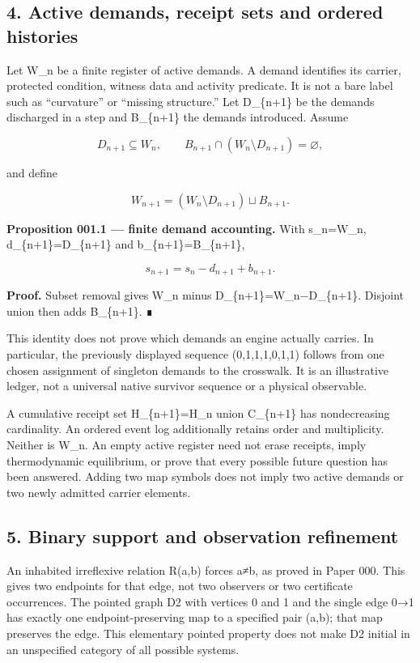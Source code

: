 \documentclass[
  11pt,
]{article}
\begin{document}
\subsection{4. Active demands, receipt sets and ordered
histories}\label{active-demands-receipt-sets-and-ordered-histories}

Let W\_n be a finite register of active demands. A demand identifies its
carrier, protected condition, witness data and activity predicate. It is
not a bare label such as ``curvature'' or ``missing structure.'' Let
D\_\{n+1\} be the demands discharged in a step and B\_\{n+1\} the
demands introduced. Assume

\[
D_{n+1}\subseteq W_n,\qquad
B_{n+1}\cap(W_n\setminus D_{n+1})=\varnothing,
\]

and define

\[
W_{n+1}=(W_n\setminus D_{n+1})\sqcup B_{n+1}.
\]

\textbf{Proposition 001.1 --- finite demand accounting.} With
s\_n=\textbar W\_n\textbar, d\_\{n+1\}=\textbar D\_\{n+1\}\textbar{} and
b\_\{n+1\}=\textbar B\_\{n+1\}\textbar,

\[
s_{n+1}=s_n-d_{n+1}+b_{n+1}.
\]

\textbf{Proof.} Subset removal gives \textbar W\_n minus
D\_\{n+1\}\textbar=\textbar W\_n\textbar−\textbar D\_\{n+1\}\textbar.
Disjoint union then adds \textbar B\_\{n+1\}\textbar. ∎

This identity does not prove which demands an engine actually carries.
In particular, the previously displayed sequence (0,1,1,1,0,1,1) follows
from one chosen assignment of singleton demands to the crosswalk. It is
an illustrative ledger, not a universal native survivor sequence or a
physical observable.

A cumulative receipt set H\_\{n+1\}=H\_n union C\_\{n+1\} has
nondecreasing cardinality. An ordered event log additionally retains
order and multiplicity. Neither is W\_n. An empty active register need
not erase receipts, imply thermodynamic equilibrium, or prove that every
possible future question has been answered. Adding two map symbols does
not imply two active demands or two newly admitted carrier elements.

\subsection{5. Binary support and observation
refinement}\label{binary-support-and-observation-refinement}

An inhabited irreflexive relation R(a,b) forces a≠b, as proved in Paper
000. This gives two endpoints for that edge, not two observers or two
certificate occurrences. The pointed graph D2 with vertices 0 and 1 and
the single edge 0→1 has exactly one endpoint-preserving map to a
specified pair (a,b); that map preserves the edge. This elementary
pointed property does not make D2 initial in an unspecified category of
all possible systems.
\end{document}
